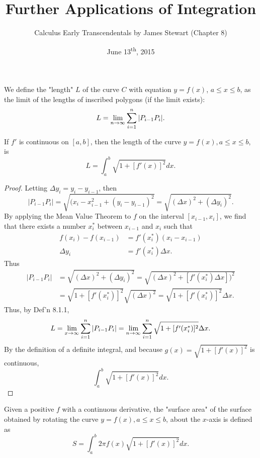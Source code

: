 \documentclass[a4paper,8pt]{article}
\title{Further Applications of Integration}
\author{Calculus Early Transcendentals by James Stewart (Chapter 8)}
\date{June 13\textsuperscript{th}, 2015}
\begin{document}
\maketitle
{}

\begin{outline}

    We define the "length" \(L\) of the curve \(C\) with equation \(y=f(x)\), \(a\leq x\leq b\), as the limit of
    the lengths of inscribed polygons (if the limit exists): \[ L = \lim\limits_{n\rightarrow \infty^{}}\sum_{i=1}^n|P_{i-1}P_i|\text{.} \]

    If \(f'\) is continuous on \([a, b]\), then the length of the curve \(y=f(x), a\leq x \leq b\), is
    \[ L = \int_a^b\sqrt{1 + [f'(x)]^2}dx\text{.} \]

    \begin{proof}
      Letting \(\Delta{y_i} = y_i - y_{i-1}\), then
      \[ |P_{i-1}P_i| = \sqrt{(x_i-x_{i-1}^2 + (y_i-y_{i-1})^2} = \sqrt{(\Delta{x})^2+(\Delta{y_i})^2}\text{.} \]
      By applying the Mean Value Theorem to \(f\) on the interval \([x_{i-1}, x_i]\), we find that there exists
      a number \(x_i^*\) between \(x_{i-1}\) and \(x_i\) such that
      \begin{align*}
        f(x_i) - f(x_{i-1}) &= f'(x_i^*)(x_i - x_{i-1}) \\
        \Delta{y_i} &= f'(x_i^*)\Delta{x}\text{.}
      \end{align*}
      Thus
      \begin{align*}
        |P_{i-1}P_i| &= \sqrt{(\Delta{x})^2+(\Delta{y_i})^2} = \sqrt{(\Delta{x})^2+[f'(x_i^*)\Delta{x}])^2} \\
                     &= \sqrt{1 + [f'(x_i^*)]^2}\sqrt{(\Delta{x})^2} = \sqrt{1+[f'(x_i^*)]^2}\Delta{x}\text{.}
      \end{align*}
      Thus, by Def'n 8.1.1,
      \[
        L = \lim\limits_{x\rightarrow \infty^{}}\sum_{i=1}^n|P_{i-1}P_i|
          = \lim\limits_{n\rightarrow \infty^{}}\sum_{i=1}^n\sqrt{1+[f'(x_i^*)]^2}\Delta{x}\text{.}
      \]
      By the definition of a definite integral, and because \(g(x) = \sqrt{1+[f'(x)]^2}\) is continuous,
      \[ \int_a^b\sqrt{1+[f'(x)]^2}dx\text{.} \]
    \end{proof}

    Given a positive \(f\) with a continuous derivative, the "surface area" of the surface obtained by rotating
    the curve \(y = f(x), a \leq x \leq b\), about the \(x\)-axis is defined as \[ S = \int_a^b2\pi
    f(x)\sqrt{1+[f'(x)]^2}dx\text{.} \]


\end{outline}
\end{document}
